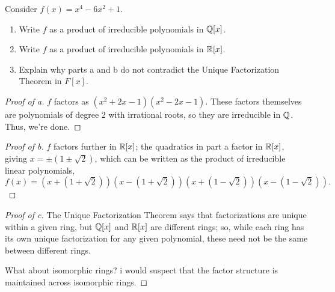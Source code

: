 \documentclass[../hw5]{subfiles}
\begin{document}
\begin{problem}
Consider $f(x)=x^4-6x^2+1$.
\begin{enumerate}[label=\alph*)]
	\item Write $f$ as a product of irreducible polynomials in  $\mathbb{Q}[x]$.
	\item Write $f$ as a product of irreducible polynomials in  $\mathbb{R}[x]$.
	\item  Explain why parts a and b do not contradict the Unique Factorization Theorem in $F[x]$.
\end{enumerate}
\end{problem}
\begin{proof}[Proof of a]
	$f$ factors as  $(x^2+2x-1)(x^2-2x-1)$.
	These factors themselves are polynomials of degree 2 with irrational roots, so they are irreducible in $\mathbb{Q}$.
	Thus, we're done.
\end{proof}
\begin{proof}[Proof of b]
	$f$ factors further in  $\mathbb{R}[x]$;
	the quadratics in part a factor in $\mathbb{R}[x]$, giving $x= \pm (1 \pm \sqrt{2})$,
	which can be written as the product of irreducible linear polynomials, \[
		f(x)=(x+(1+\sqrt{2} ))(x-(1+\sqrt{2} ))(x+(1-\sqrt{2} ))(x-(1-\sqrt{2} ))
		.\]
\end{proof}
\begin{proof}[Proof of c]
	The Unique Factorization Theorem says that factorizations are unique within a given ring, but $\mathbb{Q}[x]$ and $\mathbb{R}[x]$ are different rings; so, while each ring has its own unique factorization for any given polynomial, these need not be the same between different rings.

	What about isomorphic rings? i would suspect that the factor structure is maintained across isomorphic rings.
\end{proof}
\end{document}

